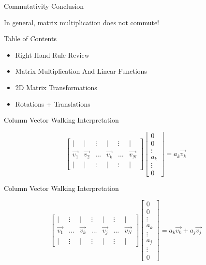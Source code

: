 \documentclass{beamer}
\begin{document}
\begin{frame}{Commutativity Conclusion}

In general, matrix multiplication does not commute!

\end{frame}


\begin{frame}{Table of Contents}

\begin{itemize}[label=$\vartriangleright$]
	\item Right Hand Rule Review
    \item Matrix Multiplication And Linear Functions
    \item 2D Matrix Transformations
\end{itemize}
\begin{itemize}[label=$\blacktriangleright$]
    \item Rotations + Translations
\end{itemize}
\end{frame}


\begin{frame}{Column Vector Walking Interpretation}

\[
\left[ \begin{array}{cccccc} | & | & \vdots & | & \vdots & | \\ \vec{v_1} & \vec{v_2} & \hdots & \vec{v_k} & \hdots & \vec{v_N} \\ | & | & \vdots & | & \vdots & | \end{array}  \right] \left[ \begin{array}{c} 0 \\ 0 \\ \vdots \\ a_k \\ \vdots \\ 0 \end{array} \right] = a_k \vec{v_k}
\]

\end{frame}


\begin{frame}{Column Vector Walking Interpretation}

\[
\left[ \begin{array}{ccccccc} | & \vdots & | & \vdots & | & \vdots & | \\ \vec{v_1} & \hdots & \vec{v_k} & \hdots & \vec{v_j} & \hdots & \vec{v_N} \\| & \vdots & | & \vdots & | & \vdots & | \end{array}  \right] \left[ \begin{array}{c} 0 \\ 0 \\ \vdots \\ a_k \\ \vdots \\ a_j \\ \vdots \\ 0 \end{array} \right] = a_k \vec{v_k} + a_j \vec{v_j}
\]

\end{frame}
\end{document}
